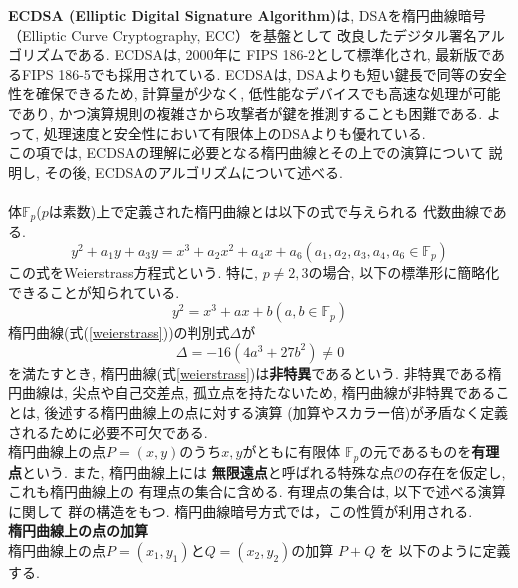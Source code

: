 \indent \textbf{ECDSA (Elliptic Digital Signature Algorithm)}は, 
DSAを楕円曲線暗号（Elliptic Curve Cryptography, ECC）を基盤として
改良したデジタル署名アルゴリズムである.
ECDSAは, 2000年に FIPS 186-2として標準化され, 
最新版であるFIPS 186-5\cite{fips186-5}でも採用されている.
ECDSAは, DSAよりも短い鍵長で同等の安全性を確保できるため, 
計算量が少なく, 低性能なデバイスでも高速な処理が可能であり, 
かつ演算規則の複雑さから攻撃者が鍵を推測することも困難である. 
よって, 処理速度と安全性において有限体上のDSAよりも優れている. \\
\indent この項では, ECDSAの理解に必要となる楕円曲線とその上での演算について
説明し, その後, ECDSAのアルゴリズムについて述べる.\\[1em]

\\
\indent 体$\mathbb{F}_p$($p$は素数)上で定義された楕円曲線とは以下の式で与えられる
代数曲線である.
\[
  y^2+a_1y+a_3y=x^3+a_2x^2+a_4x+a_6　　(a_1,a_2,a_3,a_4,a_6\in\mathbb{F}_p)
\]
この式をWeierstrass方程式という\cite{安田}. 
特に, $p\neq 2,3$の場合, 以下の標準形に簡略化できることが知られている. 
\begin{equation}\label{weierstrass}
  y^2=x^3+ax+b　　(a,b\in\mathbb{F}_p)
\end{equation}
\indent 楕円曲線(式(\ref{weierstrass}))の判別式$\Delta$が
\[
  \Delta=-16(4a^3+27b^2)\neq 0
\]
を満たすとき, 楕円曲線(式\ref{weierstrass})は\textbf{非特異}であるという. 
非特異である楕円曲線は, 尖点や自己交差点, 孤立点を持たないため, 
楕円曲線が非特異であることは, 後述する楕円曲線上の点に対する演算
(加算やスカラー倍)が矛盾なく定義されるために必要不可欠である.\\
\indent 楕円曲線上の点$P=(x,y)$のうち$x,y$がともに有限体
$\mathbb{F}_p$の元であるものを\textbf{有理点}という. また, 楕円曲線上には
\textbf{無限遠点}と呼ばれる特殊な点$\mathcal{O}$の存在を仮定し, これも楕円曲線上の
有理点の集合に含める. 有理点の集合は, 以下で述べる演算に関して
群の構造をもつ. 楕円曲線暗号方式では，この性質が利用される.\\[1em]
\noindent\textbf{楕円曲線上の点の加算}\\
\indent 楕円曲線上の点$P=(x_1,y_1)$と$Q=(x_2,y_2)$の加算 $P+Q$ を
以下のように定義する.
